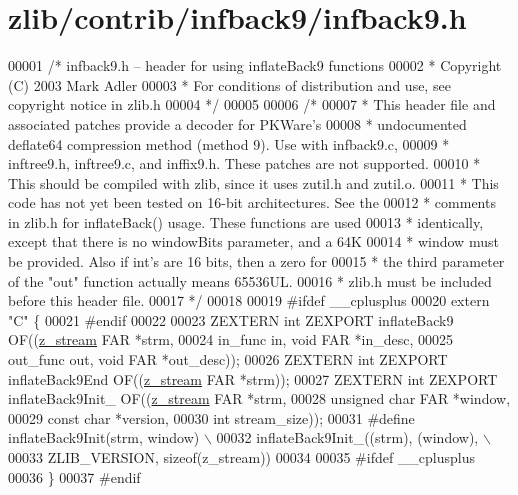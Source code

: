 \hypertarget{zlib_2contrib_2infback9_2infback9_8h_source}{}\section{zlib/contrib/infback9/infback9.h}
\label{zlib_2contrib_2infback9_2infback9_8h_source}

\begin{DoxyCode}
00001 \textcolor{comment}{/* infback9.h -- header for using inflateBack9 functions}
00002 \textcolor{comment}{ * Copyright (C) 2003 Mark Adler}
00003 \textcolor{comment}{ * For conditions of distribution and use, see copyright notice in zlib.h}
00004 \textcolor{comment}{ */}
00005 
00006 \textcolor{comment}{/*}
00007 \textcolor{comment}{ * This header file and associated patches provide a decoder for PKWare's}
00008 \textcolor{comment}{ * undocumented deflate64 compression method (method 9).  Use with infback9.c,}
00009 \textcolor{comment}{ * inftree9.h, inftree9.c, and inffix9.h.  These patches are not supported.}
00010 \textcolor{comment}{ * This should be compiled with zlib, since it uses zutil.h and zutil.o.}
00011 \textcolor{comment}{ * This code has not yet been tested on 16-bit architectures.  See the}
00012 \textcolor{comment}{ * comments in zlib.h for inflateBack() usage.  These functions are used}
00013 \textcolor{comment}{ * identically, except that there is no windowBits parameter, and a 64K}
00014 \textcolor{comment}{ * window must be provided.  Also if int's are 16 bits, then a zero for}
00015 \textcolor{comment}{ * the third parameter of the "out" function actually means 65536UL.}
00016 \textcolor{comment}{ * zlib.h must be included before this header file.}
00017 \textcolor{comment}{ */}
00018 
00019 \textcolor{preprocessor}{#ifdef \_\_cplusplus}
00020 \textcolor{keyword}{extern} \textcolor{stringliteral}{"C"} \{
00021 \textcolor{preprocessor}{#endif}
00022 
00023 ZEXTERN \textcolor{keywordtype}{int} ZEXPORT inflateBack9 OF((\hyperlink{structz__stream__s}{z\_stream} FAR *strm,
00024                                     in\_func in, \textcolor{keywordtype}{void} FAR *in\_desc,
00025                                     out\_func out, \textcolor{keywordtype}{void} FAR *out\_desc));
00026 ZEXTERN \textcolor{keywordtype}{int} ZEXPORT inflateBack9End OF((\hyperlink{structz__stream__s}{z\_stream} FAR *strm));
00027 ZEXTERN \textcolor{keywordtype}{int} ZEXPORT inflateBack9Init\_ OF((\hyperlink{structz__stream__s}{z\_stream} FAR *strm,
00028                                          \textcolor{keywordtype}{unsigned} \textcolor{keywordtype}{char} FAR *window,
00029                                          \textcolor{keyword}{const} \textcolor{keywordtype}{char} *version,
00030                                          \textcolor{keywordtype}{int} stream\_size));
00031 \textcolor{preprocessor}{#define inflateBack9Init(strm, window) \(\backslash\)}
00032 \textcolor{preprocessor}{        inflateBack9Init\_((strm), (window), \(\backslash\)}
00033 \textcolor{preprocessor}{        ZLIB\_VERSION, sizeof(z\_stream))}
00034 
00035 \textcolor{preprocessor}{#ifdef \_\_cplusplus}
00036 \}
00037 \textcolor{preprocessor}{#endif}
\end{DoxyCode}
